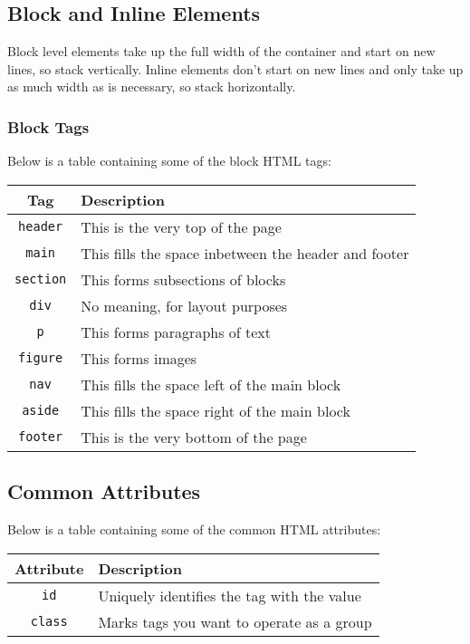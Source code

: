 \subsection{Block and Inline Elements}

Block level elements take up the full width of the container
and start on new lines, so stack vertically. \newline
Inline elements don't start on new lines and only take
up as much width as is necessary, so stack horizontally.

\subsubsection{Block Tags}

Below is a table containing some of the block HTML tags: 
\begin{center}
    \begin{tabular}{| c | p{5cm} |}
        \hline
        Tag & Description \\
        \hline \hline
        \texttt{header} & This is the very top of the page \\
        \hline
        \texttt{main} & This fills the space inbetween the 
        header and footer \\
        \hline
        \texttt{section} & This forms subsections of blocks \\
        \hline
        \texttt{div} & No meaning, for layout purposes \\
        \hline
        \texttt{p} & This forms paragraphs of text \\
        \hline
        \texttt{figure} & This forms images \\
        \hline
        \texttt{nav} & This fills the space left of the main block \\
        \hline
        \texttt{aside} & This fills the space right of the main block \\
        \hline
        \texttt{footer} & This is the very bottom of the page \\
        \hline
    \end{tabular}
\end{center}

\subsection{Common Attributes}

Below is a table containing some of the common HTML attributes: 
\begin{center}
    \begin{tabular}{| c | p{5cm} |}
        \hline
        Attribute & Description \\
        \hline \hline
        \texttt{id} & Uniquely identifies the tag with the value \\
        \hline
        \texttt{class} & Marks tags you want to operate as a group \\
        \hline
    \end{tabular}
\end{center}

